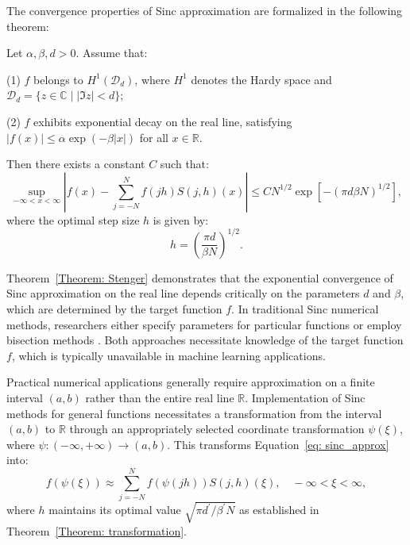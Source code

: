 The convergence properties of Sinc approximation are formalized in the following theorem:

\begin{theorem}\label{Theorem: Stenger} \citep{sugihara2004recent}
Let $\alpha, \beta, d >0$. Assume that:

(1) $f$ belongs to $H^1(\mathcal{D}_d)$, where $H^1$ denotes the Hardy space and $\mathcal{D}_d=\{z\in \mathbb{C} \mid |\Im z|<d\}$;

(2) $f$ exhibits exponential decay on the real line, satisfying $|f(x)| \leq \alpha \exp (-\beta|x|)$ for all $x \in \mathbb{R}$.

Then there exists a constant $C$ such that:
\begin{equation}
\sup _{-\infty<x<\infty}|f(x)-\sum_{j=-N}^N f(j h) S(j, h)(x)| \leq C N^{1/2} \exp [-(\pi d \beta N)^{1/2}],   
\end{equation}
where the optimal step size $h$ is given by:
\begin{equation}\label{optimal_h}
h=\left(\frac{\pi d}{\beta N}\right)^{1/2}.    
\end{equation}
\end{theorem}

Theorem~\ref{Theorem: Stenger} demonstrates that the exponential convergence of Sinc approximation on the real line depends critically on the parameters $d$ and $\beta$, which are determined by the target function $f$. In traditional Sinc numerical methods, researchers either specify parameters for particular functions \citep{sugihara2004recent,mohsen2017accurate} or employ bisection methods \citep{richardson2011sinc}. Both approaches necessitate knowledge of the target function $f$, which is typically unavailable in machine learning applications.

Practical numerical applications generally require approximation on a finite interval $(a,b)$ rather than the entire real line $\mathbb{R}$. Implementation of Sinc methods for general functions necessitates a transformation from the interval $(a, b)$ to $\mathbb{R}$ through an appropriately selected coordinate transformation $\psi(\xi)$, where $\psi: (-\infty,+\infty) \rightarrow (a,b)$. This transforms Equation~\ref{eq: sinc_approx} into:
\begin{equation}\label{eq: sinc_approx_trans}
f(\psi(\xi)) \approx \sum_{j=-N}^N f(\psi(j h)) S(j, h)(\xi), \quad -\infty<\xi<\infty,
\end{equation}
where $h$ maintains its optimal value $\sqrt{\pi d^\prime/\beta^\prime N}$ as established in Theorem~\ref{Theorem: transformation}.

